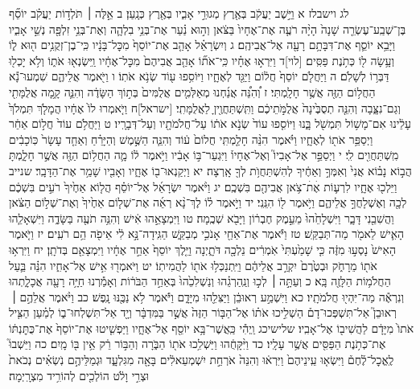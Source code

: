 \documentclass[twoside, openany, parskip=half, 11pt]{book}
\begin{document}
לג וישבלז א וַיֵּ֣שֶׁב יַעֲקֹ֔ב בְּאֶ֖רֶץ מְגוּרֵ֣י אָבִ֑יו בְּאֶ֖רֶץ כְּנָֽעַן׃ ב אֵ֣לֶּה ׀ תֹּלְד֣וֹת יַעֲקֹ֗ב יוֹסֵ֞ף בֶּן־שְׁבַֽע־עֶשְׂרֵ֤ה שָׁנָה֙ הָיָ֨ה רֹעֶ֤ה אֶת־אֶחָיו֙ בַּצֹּ֔אן וְה֣וּא נַ֗עַר אֶת־בְּנֵ֥י בִלְהָ֛ה וְאֶת־בְּנֵ֥י זִלְפָּ֖ה נְשֵׁ֣י אָבִ֑יו וַיָּבֵ֥א יוֹסֵ֛ף אֶת־דִּבָּתָ֥ם רָעָ֖ה אֶל־אֲבִיהֶֽם׃ ג וְיִשְׂרָאֵ֗ל אָהַ֤ב אֶת־יוֹסֵף֙ מִכׇּל־בָּנָ֔יו כִּֽי־בֶן־זְקֻנִ֥ים ה֖וּא ל֑וֹ וְעָ֥שָׂה ל֖וֹ כְּתֹ֥נֶת פַּסִּֽים׃ [לוי]ד וַיִּרְא֣וּ אֶחָ֗יו כִּֽי־אֹת֞וֹ אָהַ֤ב אֲבִיהֶם֙ מִכׇּל־אֶחָ֔יו וַֽיִּשְׂנְא֖וּ אֹת֑וֹ וְלֹ֥א יָכְל֖וּ דַּבְּר֥וֹ לְשָׁלֹֽם׃ ה וַיַּחֲלֹ֤ם יוֹסֵף֙ חֲל֔וֹם וַיַּגֵּ֖ד לְאֶחָ֑יו וַיּוֹסִ֥פוּ ע֖וֹד שְׂנֹ֥א אֹתֽוֹ׃ ו וַיֹּ֖אמֶר אֲלֵיהֶ֑ם שִׁמְעוּ־נָ֕א הַחֲל֥וֹם הַזֶּ֖ה אֲשֶׁ֥ר חָלָֽמְתִּי׃ ז וְ֠הִנֵּ֠ה אֲנַ֜חְנוּ מְאַלְּמִ֤ים אֲלֻמִּים֙ בְּת֣וֹךְ הַשָּׂדֶ֔ה וְהִנֵּ֛ה קָ֥מָה אֲלֻמָּתִ֖י וְגַם־נִצָּ֑בָה וְהִנֵּ֤ה תְסֻבֶּ֙ינָה֙ אֲלֻמֹּ֣תֵיכֶ֔ם וַתִּֽשְׁתַּחֲוֶ֖יןָ לַאֲלֻמָּתִֽי׃ [ישראל]ח וַיֹּ֤אמְרוּ לוֹ֙ אֶחָ֔יו הֲמָלֹ֤ךְ תִּמְלֹךְ֙ עָלֵ֔ינוּ אִם־מָשׁ֥וֹל תִּמְשֹׁ֖ל בָּ֑נוּ וַיּוֹסִ֤פוּ עוֹד֙ שְׂנֹ֣א אֹת֔וֹ עַל־חֲלֹמֹתָ֖יו וְעַל־דְּבָרָֽיו׃ ט וַיַּחֲלֹ֥ם עוֹד֙ חֲל֣וֹם אַחֵ֔ר וַיְסַפֵּ֥ר אֹת֖וֹ לְאֶחָ֑יו וַיֹּ֗אמֶר הִנֵּ֨ה חָלַ֤מְתִּֽי חֲלוֹם֙ ע֔וֹד וְהִנֵּ֧ה הַשֶּׁ֣מֶשׁ וְהַיָּרֵ֗חַ וְאַחַ֤ד עָשָׂר֙ כּֽוֹכָבִ֔ים מִֽשְׁתַּחֲוִ֖ים לִֽי׃ י וַיְסַפֵּ֣ר אֶל־אָבִיו֮ וְאֶל־אֶחָיו֒ וַיִּגְעַר־בּ֣וֹ אָבִ֔יו וַיֹּ֣אמֶר ל֔וֹ מָ֛ה הַחֲל֥וֹם הַזֶּ֖ה אֲשֶׁ֣ר חָלָ֑מְתָּ הֲב֣וֹא נָב֗וֹא אֲנִי֙ וְאִמְּךָ֣ וְאַחֶ֔יךָ לְהִשְׁתַּחֲוֺ֥ת לְךָ֖ אָֽרְצָה׃ יא וַיְקַנְאוּ־ב֖וֹ אֶחָ֑יו וְאָבִ֖יו שָׁמַ֥ר אֶת־הַדָּבָֽר׃ שנייב וַיֵּלְכ֖וּ אֶחָ֑יו לִרְע֛וֹת אֶׄתׄ־צֹ֥אן אֲבִיהֶ֖ם בִּשְׁכֶֽם׃ יג וַיֹּ֨אמֶר יִשְׂרָאֵ֜ל אֶל־יוֹסֵ֗ף הֲל֤וֹא אַחֶ֙יךָ֙ רֹעִ֣ים בִּשְׁכֶ֔ם לְכָ֖ה וְאֶשְׁלָחֲךָ֣ אֲלֵיהֶ֑ם וַיֹּ֥אמֶר ל֖וֹ הִנֵּֽנִי׃ יד וַיֹּ֣אמֶר ל֗וֹ לֶךְ־נָ֨א רְאֵ֜ה אֶת־שְׁל֤וֹם אַחֶ֙יךָ֙ וְאֶת־שְׁל֣וֹם הַצֹּ֔אן וַהֲשִׁבֵ֖נִי דָּבָ֑ר וַיִּשְׁלָחֵ֙הוּ֙ מֵעֵ֣מֶק חֶבְר֔וֹן וַיָּבֹ֖א שְׁכֶֽמָה׃ טו וַיִּמְצָאֵ֣הוּ אִ֔ישׁ וְהִנֵּ֥ה תֹעֶ֖ה בַּשָּׂדֶ֑ה וַיִּשְׁאָלֵ֧הוּ הָאִ֛ישׁ לֵאמֹ֖ר מַה־תְּבַקֵּֽשׁ׃ טז וַיֹּ֕אמֶר אֶת־אַחַ֖י אָנֹכִ֣י מְבַקֵּ֑שׁ הַגִּֽידָה־נָּ֣א לִ֔י אֵיפֹ֖ה הֵ֥ם רֹעִֽים׃ יז וַיֹּ֤אמֶר הָאִישׁ֙ נָסְע֣וּ מִזֶּ֔ה כִּ֤י שָׁמַ֙עְתִּי֙ אֹֽמְרִ֔ים נֵלְכָ֖ה דֹּתָ֑יְנָה וַיֵּ֤לֶךְ יוֹסֵף֙ אַחַ֣ר אֶחָ֔יו וַיִּמְצָאֵ֖ם בְּדֹתָֽן׃ יח וַיִּרְא֥וּ אֹת֖וֹ מֵרָחֹ֑ק וּבְטֶ֙רֶם֙ יִקְרַ֣ב אֲלֵיהֶ֔ם וַיִּֽתְנַכְּל֥וּ אֹת֖וֹ לַהֲמִיתֽוֹ׃ יט וַיֹּאמְר֖וּ אִ֣ישׁ אֶל־אָחִ֑יו הִנֵּ֗ה בַּ֛עַל הַחֲלֹמ֥וֹת הַלָּזֶ֖ה בָּֽא׃ כ וְעַתָּ֣ה ׀ לְכ֣וּ וְנַֽהַרְגֵ֗הוּ וְנַשְׁלִכֵ֙הוּ֙ בְּאַחַ֣ד הַבֹּר֔וֹת וְאָמַ֕רְנוּ חַיָּ֥ה רָעָ֖ה אֲכָלָ֑תְהוּ וְנִרְאֶ֕ה מַה־יִּהְי֖וּ חֲלֹמֹתָֽיו׃ כא וַיִּשְׁמַ֣ע רְאוּבֵ֔ן וַיַּצִּלֵ֖הוּ מִיָּדָ֑ם וַיֹּ֕אמֶר לֹ֥א נַכֶּ֖נּוּ נָֽפֶשׁ׃ כב וַיֹּ֨אמֶר אֲלֵהֶ֣ם ׀ רְאוּבֵן֮ אַל־תִּשְׁפְּכוּ־דָם֒ הַשְׁלִ֣יכוּ אֹת֗וֹ אֶל־הַבּ֤וֹר הַזֶּה֙ אֲשֶׁ֣ר בַּמִּדְבָּ֔ר וְיָ֖ד אַל־תִּשְׁלְחוּ־ב֑וֹ לְמַ֗עַן הַצִּ֤יל אֹתוֹ֙ מִיָּדָ֔ם לַהֲשִׁיב֖וֹ אֶל־אָבִֽיו׃ שלישיכג וַֽיְהִ֕י כַּֽאֲשֶׁר־בָּ֥א יוֹסֵ֖ף אֶל־אֶחָ֑יו וַיַּפְשִׁ֤יטוּ אֶת־יוֹסֵף֙ אֶת־כֻּתׇּנְתּ֔וֹ אֶת־כְּתֹ֥נֶת הַפַּסִּ֖ים אֲשֶׁ֥ר עָלָֽיו׃ כד וַיִּ֨קָּחֻ֔הוּ וַיַּשְׁלִ֥כוּ אֹת֖וֹ הַבֹּ֑רָה וְהַבּ֣וֹר רֵ֔ק אֵ֥ין בּ֖וֹ מָֽיִם׃ כה וַיֵּשְׁבוּ֮ לֶֽאֱכׇל־לֶ֒חֶם֒ וַיִּשְׂא֤וּ עֵֽינֵיהֶם֙ וַיִּרְא֔וּ וְהִנֵּה֙ אֹרְחַ֣ת יִשְׁמְעֵאלִ֔ים בָּאָ֖ה מִגִּלְעָ֑ד וּגְמַלֵּיהֶ֣ם נֹֽשְׂאִ֗ים נְכֹאת֙ וּצְרִ֣י וָלֹ֔ט הוֹלְכִ֖ים לְהוֹרִ֥יד מִצְרָֽיְמָה׃ 
\end{document}
